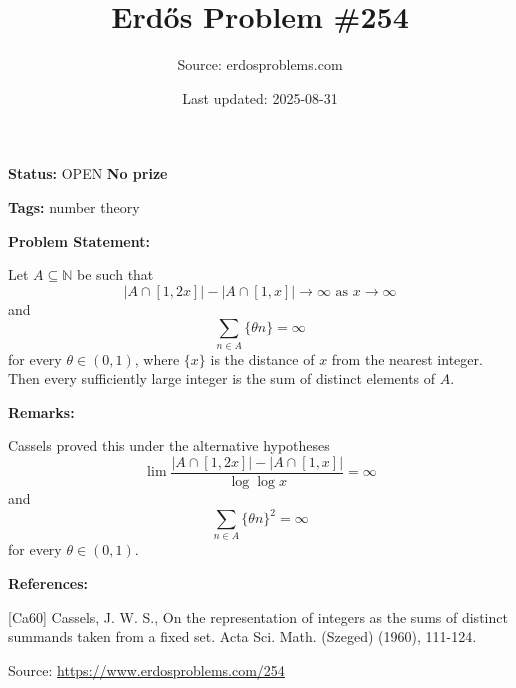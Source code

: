 \documentclass{article}
\title{Erd\H{o}s Problem \#254}
\date{Last updated: 2025-08-31}
\author{Source: erdosproblems.com}
\begin{document}
\maketitle

\noindent\textbf{Status:} OPEN \quad \textbf{No prize}

\noindent\textbf{Tags:} number theory

\medskip
\noindent\textbf{Problem Statement:}

Let $A\subseteq \mathbb{N}$ be such that\[\lvert A\cap [1,2x]\rvert -\lvert A\cap [1,x]\rvert \to \infty\textrm{ as }x\to \infty\]and\[\sum_{n\in A} \{ \theta n\}=\infty\]for every $\theta\in (0,1)$, where $\{x\}$ is the distance of $x$ from the nearest integer. Then every sufficiently large integer is the sum of distinct elements of $A$.

\bigskip
\noindent\textbf{Remarks:}

Cassels \cite{Ca60} proved this under the alternative hypotheses\[\lim \frac{\lvert A\cap [1,2x]\rvert -\lvert A\cap [1,x]\rvert}{\log\log x}=\infty\]and\[\sum_{n\in A} \{ \theta n\}^2=\infty\]for every $\theta\in (0,1)$.

\bigskip
\noindent\textbf{References:}

[Ca60] Cassels, J. W. S., On the representation of integers as the sums of distinct summands taken from a fixed set. Acta Sci. Math. (Szeged) (1960), 111-124.

\bigskip
\noindent\small{Source: \url{https://www.erdosproblems.com/254}}
\end{document}
